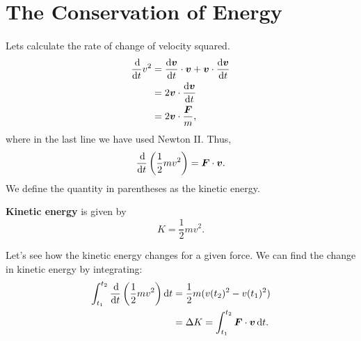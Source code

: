 \documentclass[../classical_mechanics.tex]{subfiles}
\begin{document}
    \section{The Conservation of Energy}\label{sec:conservation-of-energy}
        \paragraph{}
        Lets calculate the rate of change of velocity squared.
        \begin{align}
            \dv{}{t}v^2&=\dv{\vec{v}}{t}\cdot\vec{v}+\vec{v}\cdot\dv{\vec{v}}{t}\\
            &=2\vec{v}\cdot\dv{\vec{v}}{t}\\
            &=2\vec{v}\cdot\frac{\vec{F}}{m},
        \end{align}
        where in the last line we have used Newton II. Thus,
        \begin{equation}
            \dv{}{t}\left(\frac{1}{2}mv^2\right)=\vec{F}\cdot\vec{v}.
        \end{equation}
        We define the quantity in parentheses as the kinetic energy.
        \begin{definition}
            \textbf{Kinetic energy} is given by
            \begin{equation}
                K=\frac{1}{2}mv^2.
            \end{equation}
        \end{definition}
        Let's see how the kinetic energy changes for a given force. We can find the change in kinetic energy by integrating:
        \begin{align}
            \int_{t_1}^{t_2}\dv{}{t}\left(\frac{1}{2}mv^2\right)\dd{t}&=\frac{1}{2}m(v(t_2)^2-v(t_1)^2)\\
            &=\Delta K=\int_{t_1}^{t_2}\vec{F}\cdot\vec{v}\dd{t}.
        \end{align}
\end{document}

